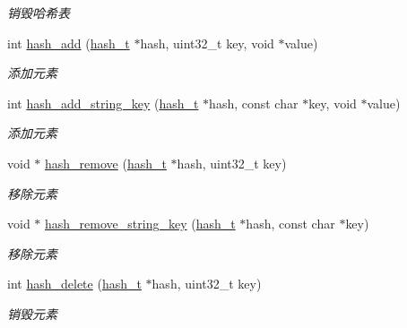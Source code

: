 \begin{DoxyCompactItemize}
\begin{DoxyCompactList}\small\item\em 销毁哈希表 \end{DoxyCompactList}\item 
int \hyperlink{a00062_aa74d5b564965d7d3f162eb5308bc9b3f_aa74d5b564965d7d3f162eb5308bc9b3f}{hash\+\_\+add} (\hyperlink{a00050_a188677c3015513590ab998e96b999966_a188677c3015513590ab998e96b999966}{hash\+\_\+t} $\ast$hash, uint32\+\_\+t key, void $\ast$value)
\begin{DoxyCompactList}\small\item\em 添加元素 \end{DoxyCompactList}\item 
int \hyperlink{a00062_ad5b36fd89c94138d38be050314d922ed_ad5b36fd89c94138d38be050314d922ed}{hash\+\_\+add\+\_\+string\+\_\+key} (\hyperlink{a00050_a188677c3015513590ab998e96b999966_a188677c3015513590ab998e96b999966}{hash\+\_\+t} $\ast$hash, const char $\ast$key, void $\ast$value)
\begin{DoxyCompactList}\small\item\em 添加元素 \end{DoxyCompactList}\item 
void $\ast$ \hyperlink{a00062_acef10836aec4eab1b2197ecaad759b34_acef10836aec4eab1b2197ecaad759b34}{hash\+\_\+remove} (\hyperlink{a00050_a188677c3015513590ab998e96b999966_a188677c3015513590ab998e96b999966}{hash\+\_\+t} $\ast$hash, uint32\+\_\+t key)
\begin{DoxyCompactList}\small\item\em 移除元素 \end{DoxyCompactList}\item 
void $\ast$ \hyperlink{a00062_a054f507d00a4f813455dafffe29202d1_a054f507d00a4f813455dafffe29202d1}{hash\+\_\+remove\+\_\+string\+\_\+key} (\hyperlink{a00050_a188677c3015513590ab998e96b999966_a188677c3015513590ab998e96b999966}{hash\+\_\+t} $\ast$hash, const char $\ast$key)
\begin{DoxyCompactList}\small\item\em 移除元素 \end{DoxyCompactList}\item 
int \hyperlink{a00062_ac5915f1a7177380272fbb014080217c8_ac5915f1a7177380272fbb014080217c8}{hash\+\_\+delete} (\hyperlink{a00050_a188677c3015513590ab998e96b999966_a188677c3015513590ab998e96b999966}{hash\+\_\+t} $\ast$hash, uint32\+\_\+t key)
\begin{DoxyCompactList}\small\item\em 销毁元素 \end{DoxyCompactList}\item 

\end{DoxyCompactItemize}
